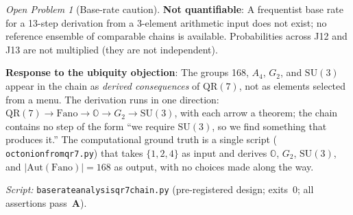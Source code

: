 \documentclass[11pt]{article}
\theoremstyle{remark}
\newtheorem{openprob}{Open Problem}
\newcommand{\lean}[1]{%
  \penalty-100
  \begingroup\def\_{\textunderscore\allowbreak}\texttt{#1}\endgroup}
\newcommand{\CatA}{\textbf{A}}
\begin{document}
\begin{openprob}[Base-rate caution]
\noindent\textbf{Not quantifiable}:
A frequentist base rate for a 13-step derivation from a 3-element arithmetic input
does not exist; no reference ensemble of comparable chains is available.
Probabilities across J12 and J13 are not multiplied (they are not independent).

\noindent\textbf{Response to the ubiquity objection}:
The groups 168, $A_4$, $G_2$, and $\mathrm{SU}(3)$ appear in the chain as
\emph{derived consequences} of $\mathrm{QR}(7)$, not as elements selected from a menu.
The derivation runs in one direction:
$\mathrm{QR}(7)\to\mathrm{Fano}\to\mathbb{O}\to G_2\to\mathrm{SU}(3)$,
with each arrow a theorem; the chain contains no step of the form
``we require $\mathrm{SU}(3)$, so we find something that produces it.''
The computational ground truth is a single script
(\lean{octonion\_from\_qr7.py}) that takes $\{1,2,4\}$ as input and derives
$\mathbb{O}$, $G_2$, $\mathrm{SU}(3)$, and $|\mathrm{Aut}(\mathrm{Fano})|=168$
as output, with no choices made along the way.

\noindent\textit{Script:} \lean{base\_rate\_analysis\_qr7\_chain.py}
(pre-registered design; exits~0; all assertions pass~\CatA).
\end{openprob}
\end{document}
